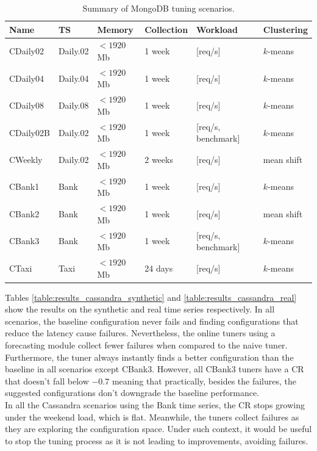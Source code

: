 \documentclass[a4paper, 12pt]{article} %
\newcommand{\ra}[1]{\renewcommand{\arraystretch}{#1}}
\begin{document}
	\begin{table}\centering 
		\ra{1.3}
		\begin{tabularx}{\textwidth}{@{}llllXX@{}}
			\midrule
			Name & TS & Memory & Collection & Workload & Clustering\\
			\midrule
			CDaily02&Daily.02 & $<1920$Mb  & 1 week & [req/s]  & $k$-means\\
			CDaily04&Daily.04 & $<1920$Mb  & 1 week & [req/s]  & $k$-means\\
			CDaily08&Daily.08 & $<1920$Mb  & 1 week & [req/s] & $k$-means\\
			CDaily02B&Daily.02 & $<1920$Mb  & 1 week & [req/s, benchmark] & $k$-means\\
			CWeekly&Daily.02 & $<1920$Mb  & 2 weeks & [req/s]  & mean shift\\
			CBank1&Bank & $<1920$Mb  & 1 week & [req/s]  & $k$-means\\
			CBank2&Bank & $<1920$Mb  & 1 week & [req/s]  & mean shift\\
			CBank3&Bank & $<1920$Mb  & 1 week & [req/s, benchmark]  & $k$-means\\
			CTaxi &Taxi & $<1920$Mb  & 24 days & [req/s]  & $k$-means\\
			
			\bottomrule
		\end{tabularx}
		\caption{Summary of MongoDB tuning scenarios. }  \label{table:results_tuning_scenarios_cassandra}
	\end{table}

	Tables \ref{table:results_cassandra_synthetic} and \ref{table:results_cassandra_real} show the results on the synthetic and real time series respectively.
	In all scenarios, the baseline configuration never fails and finding configurations that reduce the latency cause failures. Nevertheless, the online tuners using a forecasting module collect fewer failures when compared to the naive tuner. Furthermore, the tuner always instantly finds a better configuration than the baseline in all scenarios except CBank3. However, all CBank3 tuners have a CR that doesn't fall below $-0.7$ meaning that practically, besides the failures, the suggested configurations don't downgrade the baseline performance. \\
	In all the Cassandra scenarios using the Bank time series, the CR stops growing under the weekend load, which is flat. Meanwhile, the tuners collect failures as they are exploring the configuration space. Under such context, it would be useful to stop the tuning process as it is not leading to improvements, avoiding failures.
	
\end{document}
